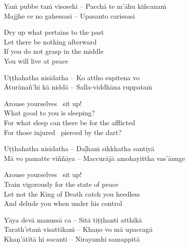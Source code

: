 \suttaRef{[Dhp 91]}

\begin{verses}
  Yaṁ pubbe taṁ visosehi – Pacchā te m'āhu kiñcanaṁ\\
  Majjhe ce no gahessasi – Upasanto carissasi
\end{verses}

\begin{english-verses}
  Dry up what pertains to the past\\
  Let there be nothing afterward\\
  If you do not grasp in the middle\\
  You will live at peace
\end{english-verses}

\suttaRef{[Snp 949]}

\begin{verses}
  Uṭṭhahatha nisīdatha – Ko attho supitena vo\\
  Āturānañ'hi kā niddā – Salla-viddhāna ruppataṁ
\end{verses}

\begin{english-verses}
  Arouse yourselves \breathmark\ sit up!\\
  What good to you is sleeping?\\
  For what sleep can there be for the afflicted\\
  For those injured \breathmark\ pierced by the dart?
\end{english-verses}

\begin{verses}
  Uṭṭhahatha nisīdatha – Daḷhaṁ sikkhatha santiyā\\
  Mā vo pamatte viññāya – Maccurājā amohayittha vas'ānuge
\end{verses}

\begin{english-verses}
  Arouse yourselves \breathmark\ sit up!\\
  Train vigorously for the state of peace\\
  Let not the King of Death catch you heedless\\
  And delude you when under his control
\end{english-verses}

\begin{verses}
  Yāya devā manussā ca – Sitā tiṭṭhanti atthikā\\
  Tarath'etaṁ visattikaṁ – Khaṇo vo mā upaccagā\\
  Khaṇ'ātītā hi socanti – Nirayamhi samappitā
\end{verses}

